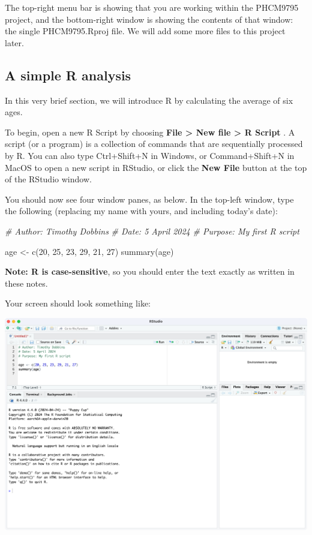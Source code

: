 \documentclass[
  a4paper,
]{memoir}
\newenvironment{Shaded}{\begin{snugshade}}{\end{snugshade}}
\newcommand{\CommentTok}[1]{\textcolor[rgb]{0.00,0.00,0.00}{\textit{#1}}}
\newcommand{\DecValTok}[1]{\textcolor[rgb]{0.00,0.00,0.00}{#1}}
\newcommand{\FunctionTok}[1]{\textcolor[rgb]{0.00,0.00,0.00}{#1}}
\newcommand{\NormalTok}[1]{\textcolor[rgb]{0.00,0.00,0.00}{#1}}
\newcommand{\OtherTok}[1]{\textcolor[rgb]{0.00,0.00,0.00}{#1}}
\begin{document}
The top-right menu bar is showing that you are working within the
PHCM9795 project, and the bottom-right window is showing the contents of
that window: the single PHCM9795.Rproj file. We will add some more files
to this project later.

\hypertarget{sec-simpleR}{%
\subsection{A simple R analysis}\label{sec-simpleR}}

In this very brief section, we will introduce R by calculating the
average of six ages.

To begin, open a new R Script by choosing \textbf{File \textgreater{}
New file \textgreater{} R Script} . A script (or a program) is a
collection of commands that are sequentially processed by R. You can
also type Ctrl+Shift+N in Windows, or Command+Shift+N in MacOS to open a
new script in RStudio, or click the \textbf{New File} button at the top
of the RStudio window.

You should now see four window panes, as below. In the top-left window,
type the following (replacing my name with yours, and including today's
date):

\begin{Shaded}
\begin{Highlighting}[]
\CommentTok{\# Author: Timothy Dobbins}
\CommentTok{\# Date: 5 April 2024}
\CommentTok{\# Purpose: My first R script}

\NormalTok{age }\OtherTok{\textless{}{-}} \FunctionTok{c}\NormalTok{(}\DecValTok{20}\NormalTok{, }\DecValTok{25}\NormalTok{, }\DecValTok{23}\NormalTok{, }\DecValTok{29}\NormalTok{, }\DecValTok{21}\NormalTok{, }\DecValTok{27}\NormalTok{)}
\FunctionTok{summary}\NormalTok{(age)}
\end{Highlighting}
\end{Shaded}

\textbf{Note: R is case-sensitive}, so you should enter the text exactly
as written in these notes.

Your screen should look something like:

\includegraphics[width=1\textwidth,height=\textheight]{img/mod01/RStudio-screenshot-02.png}
\end{document}
